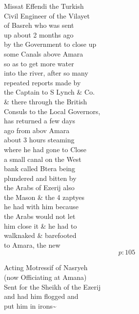 \documentclass{report}
\begin{document}
	\par{
 	Missat Effendi the Turkish\ \\Civil Engineer of the Vilayet\ \\of Basreh who was sent\ \\up about 2 months ago\ \\by the Government to close up\ \\some Canals above Amara\ \\so as to get more water\ \\into the river, after so many\ \\repeated reports made by\ \\the Captain to S Lynch \& Co.\ \\\& there through the British\ \\Consuls to the Local Governors,\ \\has returned a few days\ \\ago from abov Amara\ \\about 3 hours steaming\ \\where he had gone to Close\ \\a small canal on the West\ \\bank called Btera being\ \\plundered and bitten by\ \\the Arabs of Ezerij also\ \\the Mason \& the 4 zaptyes\ \\he had with him because\ \\the Arabs would not let\ \\him close it \& he had to\ \\walknaked \& barefooted\ \\to Amara, the new\ \\
  \[p: 105 \]

	}









	\par{
 	Acting Motressif of Nasryeh\ \\(now Officiating at Amana)\ \\Sent for the Sheikh of the Ezerij\ \\and had him flogged and\ \\put him in irons\~{}\ \\
	}
\end{document}
